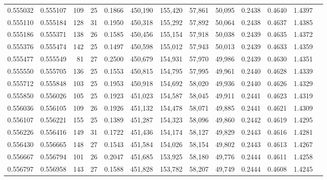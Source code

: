 \begin{tabular}{rrrrrrrrrrrrr}
0.555032 & 0.555107 & 109 &  25 &                                     0.1866 & 450,190 & 155,420 &  57,861 &  50,095 & 0.2438 & 0.4640 & 1.4397 \\
0.555110 & 0.555184 & 128 &  31 &                                     0.1950 & 450,318 & 155,292 &  57,892 &  50,064 & 0.2438 & 0.4637 & 1.4385 \\
0.555186 & 0.555371 & 138 &  26 &                                     0.1585 & 450,456 & 155,154 &  57,918 &  50,038 & 0.2439 & 0.4635 & 1.4372 \\
0.555376 & 0.555474 & 142 &  25 &                                     0.1497 & 450,598 & 155,012 &  57,943 &  50,013 & 0.2439 & 0.4633 & 1.4359 \\
0.555477 & 0.555549 &  81 &  27 &                                     0.2500 & 450,679 & 154,931 &  57,970 &  49,986 & 0.2439 & 0.4630 & 1.4351 \\
0.555550 & 0.555705 & 136 &  25 &                                     0.1553 & 450,815 & 154,795 &  57,995 &  49,961 & 0.2440 & 0.4628 & 1.4339 \\
0.555712 & 0.555848 & 103 &  25 &                                     0.1953 & 450,918 & 154,692 &  58,020 &  49,936 & 0.2440 & 0.4626 & 1.4329 \\
0.555850 & 0.556026 & 105 &  25 &                                     0.1923 & 451,023 & 154,587 &  58,045 &  49,911 & 0.2441 & 0.4623 & 1.4319 \\
0.556036 & 0.556105 & 109 &  26 &                                     0.1926 & 451,132 & 154,478 &  58,071 &  49,885 & 0.2441 & 0.4621 & 1.4309 \\
0.556107 & 0.556221 & 155 &  25 &                                     0.1389 & 451,287 & 154,323 &  58,096 &  49,860 & 0.2442 & 0.4619 & 1.4295 \\
0.556226 & 0.556416 & 149 &  31 &                                     0.1722 & 451,436 & 154,174 &  58,127 &  49,829 & 0.2443 & 0.4616 & 1.4281 \\
0.556430 & 0.556665 & 148 &  27 &                                     0.1543 & 451,584 & 154,026 &  58,154 &  49,802 & 0.2443 & 0.4613 & 1.4267 \\
0.556667 & 0.556794 & 101 &  26 &                                     0.2047 & 451,685 & 153,925 &  58,180 &  49,776 & 0.2444 & 0.4611 & 1.4258 \\
0.556797 & 0.556958 & 143 &  27 &                                     0.1588 & 451,828 & 153,782 &  58,207 &  49,749 & 0.2444 & 0.4608 & 1.4245 \\

\end{tabular}
